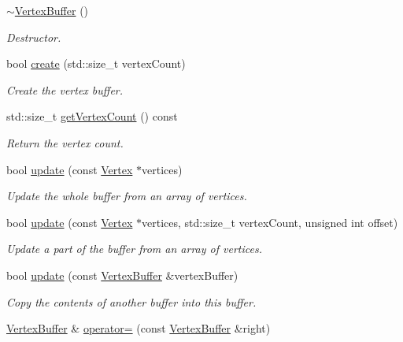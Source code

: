 \begin{DoxyCompactItemize}
\mbox{\hyperlink{classsf_1_1_vertex_buffer_acfbb3b16221bfb9406fcaa18cfcac3e7}{$\sim$\+Vertex\+Buffer}} ()
\begin{DoxyCompactList}\small\item\em Destructor. \end{DoxyCompactList}\item 
bool \mbox{\hyperlink{classsf_1_1_vertex_buffer_aa68e128d59c7f7d5eb0d4d94125439a5}{create}} (std\+::size\+\_\+t vertex\+Count)
\begin{DoxyCompactList}\small\item\em Create the vertex buffer. \end{DoxyCompactList}\item 
std\+::size\+\_\+t \mbox{\hyperlink{classsf_1_1_vertex_buffer_a6c534536ed186a2ad65e75484c8abafe}{get\+Vertex\+Count}} () const
\begin{DoxyCompactList}\small\item\em Return the vertex count. \end{DoxyCompactList}\item 
bool \mbox{\hyperlink{classsf_1_1_vertex_buffer_ad100a5f578a91c49a9009e3c6956c82d}{update}} (const \mbox{\hyperlink{classsf_1_1_vertex}{Vertex}} $\ast$vertices)
\begin{DoxyCompactList}\small\item\em Update the whole buffer from an array of vertices. \end{DoxyCompactList}\item 
bool \mbox{\hyperlink{classsf_1_1_vertex_buffer_ae6c8649a64861507010d21e77fbd53fa}{update}} (const \mbox{\hyperlink{classsf_1_1_vertex}{Vertex}} $\ast$vertices, std\+::size\+\_\+t vertex\+Count, unsigned int offset)
\begin{DoxyCompactList}\small\item\em Update a part of the buffer from an array of vertices. \end{DoxyCompactList}\item 
bool \mbox{\hyperlink{classsf_1_1_vertex_buffer_a41f8bbcf07f403e7fe29b1b905dc7544}{update}} (const \mbox{\hyperlink{classsf_1_1_vertex_buffer}{Vertex\+Buffer}} \&vertex\+Buffer)
\begin{DoxyCompactList}\small\item\em Copy the contents of another buffer into this buffer. \end{DoxyCompactList}\item 
\mbox{\hyperlink{classsf_1_1_vertex_buffer}{Vertex\+Buffer}} \& \mbox{\hyperlink{classsf_1_1_vertex_buffer_a812f98083da8f10361d457008bf9fa79}{operator=}} (const \mbox{\hyperlink{classsf_1_1_vertex_buffer}{Vertex\+Buffer}} \&right)

\end{DoxyCompactItemize}

